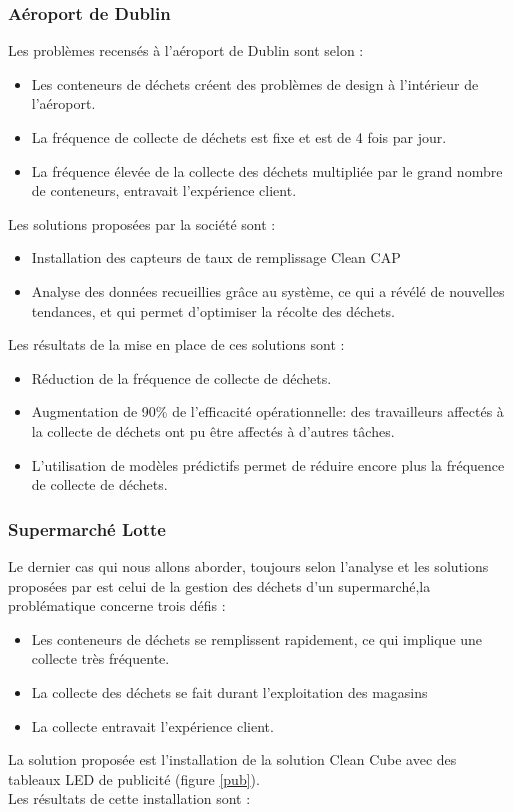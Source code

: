 \documentclass[a4paper,12pt]{report}
\begin{document}
\subsubsection*{Aéroport de Dublin}
Les problèmes recensés à l'aéroport de Dublin sont selon \cite{ref8}:
\begin{itemize}
\item Les conteneurs de déchets créent des problèmes de design à l'intérieur de l'aéroport.
\item La fréquence de collecte de déchets est fixe et est de 4 fois par jour.
\item La fréquence élevée de la collecte des déchets multipliée par le grand nombre de conteneurs, entravait l'expérience client.
\end{itemize}
Les solutions proposées par la société sont :
\begin{itemize}
\item Installation des capteurs de taux de remplissage Clean CAP
\item Analyse des données recueillies grâce au système, ce qui a révélé de nouvelles tendances, et qui permet d'optimiser la récolte des déchets.
\end{itemize}
Les résultats de la mise en place de ces solutions sont \cite{ref8}:
\begin{itemize}
\item Réduction de la fréquence de collecte de déchets.
\item Augmentation de 90\% de l'efficacité opérationnelle: des travailleurs affectés à la collecte de déchets ont pu être affectés à d'autres tâches.
\item L'utilisation de modèles prédictifs permet de réduire encore plus la fréquence de collecte de déchets.
\end{itemize}
\subsubsection*{Supermarché Lotte}
Le dernier cas qui nous allons aborder, toujours selon l'analyse et les solutions proposées par \cite{ref8} est celui de la gestion des déchets d'un supermarché,la problématique concerne trois défis :
\begin{itemize}
\item Les conteneurs de déchets se remplissent rapidement, ce qui implique une collecte très fréquente.
\item La collecte des déchets se fait durant l'exploitation des magasins
\item La collecte entravait l'expérience client.
\end{itemize}
La solution proposée est l'installation de la solution Clean Cube avec des tableaux LED de publicité (figure \ref{pub}).\\
Les résultats de cette installation sont :
\end{document}
